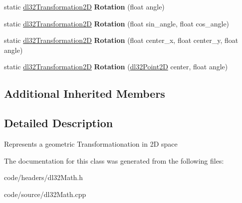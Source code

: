 \begin{DoxyCompactItemize}
\item 
\hypertarget{classdl32_transformation2_d_ab0a7e3507022812e599ce60e58d2107a}{static \hyperlink{classdl32_transformation2_d}{dl32\-Transformation2\-D} {\bfseries Rotation} (float angle)}\label{classdl32_transformation2_d_ab0a7e3507022812e599ce60e58d2107a}

\item 
\hypertarget{classdl32_transformation2_d_ad9c777aa2d6051cf7514a7c0216880b9}{static \hyperlink{classdl32_transformation2_d}{dl32\-Transformation2\-D} {\bfseries Rotation} (float sin\-\_\-angle, float cos\-\_\-angle)}\label{classdl32_transformation2_d_ad9c777aa2d6051cf7514a7c0216880b9}

\item 
\hypertarget{classdl32_transformation2_d_ab901a0a5e08a6c41e900a7845502f2ef}{static \hyperlink{classdl32_transformation2_d}{dl32\-Transformation2\-D} {\bfseries Rotation} (float center\-\_\-x, float center\-\_\-y, float angle)}\label{classdl32_transformation2_d_ab901a0a5e08a6c41e900a7845502f2ef}

\item 
\hypertarget{classdl32_transformation2_d_a1b00a0eb41047282301d2a63518671e1}{static \hyperlink{classdl32_transformation2_d}{dl32\-Transformation2\-D} {\bfseries Rotation} (\hyperlink{structdl32_point2_d}{dl32\-Point2\-D} center, float angle)}\label{classdl32_transformation2_d_a1b00a0eb41047282301d2a63518671e1}

\end{DoxyCompactItemize}
\subsection*{Additional Inherited Members}


\subsection{Detailed Description}
Represents a geometric Transformationation in 2\-D space 

The documentation for this class was generated from the following files\-:\begin{DoxyCompactItemize}
\item 
code/headers/dl32\-Math.\-h\item 
code/source/dl32\-Math.\-cpp\end{DoxyCompactItemize}
